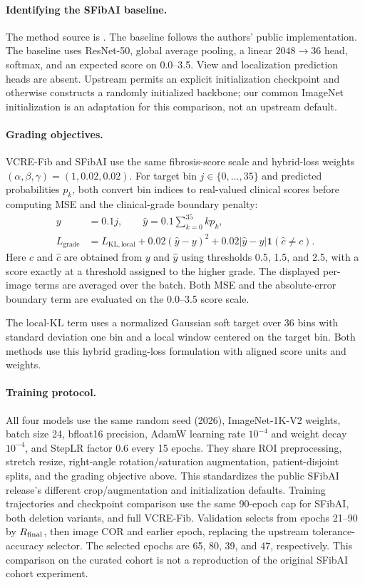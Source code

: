 \paragraph{Identifying the SFibAI baseline.}
The method source is \citet{xu2026sfibai}. The baseline follows the authors' public implementation. The baseline uses ResNet-50, global average pooling, a linear $2048\rightarrow36$ head, softmax, and an expected score on 0.0--3.5. View and localization prediction heads are absent. Upstream permits an explicit initialization checkpoint and otherwise constructs a randomly initialized backbone; our common ImageNet initialization is an adaptation for this comparison, not an upstream default.

\paragraph{Grading objectives.}
VCRE-Fib and SFibAI use the same fibrosis-score scale and hybrid-loss weights $(\alpha,\beta,\gamma)=(1,0.02,0.02)$. For target bin $j\in\{0,\ldots,35\}$ and predicted probabilities $p_k$, both convert bin indices to real-valued clinical scores before computing MSE and the clinical-grade boundary penalty:
\[
\begin{aligned}
y&=0.1j,\qquad \hat y=0.1\sum_{k=0}^{35}kp_k,\\
L_{\mathrm{grade}}&=L_{\mathrm{KL,local}}+0.02(\hat y-y)^2
 +0.02|\hat y-y|\mathbf{1}(\hat c\ne c).
\end{aligned}
\]
Here $c$ and $\hat c$ are obtained from $y$ and $\hat y$ using thresholds 0.5, 1.5, and 2.5, with a score exactly at a threshold assigned to the higher grade. The displayed per-image terms are averaged over the batch. Both MSE and the absolute-error boundary term are evaluated on the 0.0--3.5 score scale.

The local-KL term uses a normalized Gaussian soft target over 36 bins with standard deviation one bin and a local window centered on the target bin. Both methods use this hybrid grading-loss formulation with aligned score units and weights.

\paragraph{Training protocol.}
All four models use the same random seed (2026), ImageNet-1K-V2 weights, batch size 24, bfloat16 precision, AdamW learning rate $10^{-4}$ and weight decay $10^{-4}$, and StepLR factor 0.6 every 15 epochs. They share ROI preprocessing, stretch resize, right-angle rotation/saturation augmentation, patient-disjoint splits, and the grading objective above. This standardizes the public SFibAI release's different crop/augmentation and initialization defaults. Training trajectories and checkpoint comparison use the same 90-epoch cap for SFibAI, both deletion variants, and full VCRE-Fib. Validation selects from epochs 21--90 by $R_{\mathrm{final}}$, then image COR and earlier epoch, replacing the upstream tolerance-accuracy selector. The selected epochs are 65, 80, 39, and 47, respectively. This comparison on the curated cohort is not a reproduction of the original SFibAI cohort experiment.

